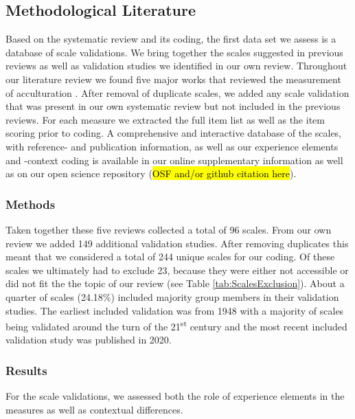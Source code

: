 \subsection{Methodological Literature}

Based on the systematic review and its coding, the first data set we
assess is a database of scale validations. We bring together the scales
suggested in previous reviews as well as validation studies we
identified in our own review. Throughout our literature review we found
five major works that reviewed the measurement of acculturation
\citep{Celenk2011, Maestas2000, Matsudaira2006, Wallace2010, Zane2004}.
After removal of duplicate scales, we added any scale validation that
was present in our own systematic review but not included in the
previous reviews. For each measure we extracted the full item list as
well as the item scoring prior to coding. A comprehensive and
interactive database of the scales, with reference- and publication
information, as well as our experience elements and -context coding is
available in our online supplementary information as well as on our open
science repository (\hl{OSF and/or github citation here}).

\subsubsection{Methods}

Taken together these five reviews collected a total of 96 scales. From
our own review we added 149 additional validation studies. After
removing duplicates this meant that we considered a total of 244 unique
scales for our coding. Of these scales we ultimately had to exclude 23,
because they were either not accessible or did not fit the the topic of
our review (see Table \ref{tab:ScalesExclusion}). About a quarter of
scales (24.18\%) included majority group members in their validation
studies. The earliest included validation was from 1948 with a majority
of scales being validated around the turn of the 21\textsuperscript{st}
century and the most recent included validation study was published in
2020.



\subsubsection{Results}

For the scale validations, we assessed both the role of experience
elements in the measures as well as contextual differences.

